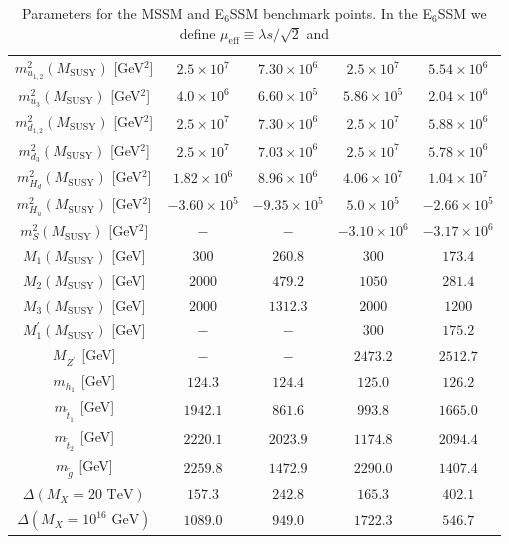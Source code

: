 \documentclass[preprint,amsmath,amssymb,aps,superscriptaddress,prd,showpacs,floatfix,nofootinbib]{revtex4-1}
\begin{document}
\begin{table}[h]
\begin{ruledtabular}
\begin{tabular}{ccccc}
$m_{u_{1,2}}^2(M_{\mathrm{SUSY}})$ [GeV$^2$] & $2.5\times 10^7$ & $7.30\times 10^6$ & $2.5\times 10^7$ & $5.54\times 10^6$ \\
$m_{u_3}^2(M_{\mathrm{SUSY}})$ [GeV$^2$] & $4.0 \times 10^6$ & $6.60\times10^5$& $5.86\times 10^5$ & $2.04\times 10^6$ \\
$m_{d_{1,2}}^2(M_{\mathrm{SUSY}})$ [GeV$^2$] & $2.5\times 10^7$ & $7.30\times 10^6$ & $2.5\times 10^7$ & $5.88\times 10^6$ \\
$m_{d_3}^2(M_{\mathrm{SUSY}})$ [GeV$^2$] & $2.5\times 10^7$ & $7.03\times 10^6$ & $2.5\times 10^7$ & $5.78\times 10^6$ \\
$m_{H_d}^2(M_{\mathrm{SUSY}})$ [GeV$^2$] & $1.82\times 10^6$ & $8.96\times 10^6$ & $4.06\times 10^7$ & $1.04\times 10^7$ \\
$m_{H_u}^2(M_{\mathrm{SUSY}})$ [GeV$^2$] & $-3.60\times 10^5$ & $-9.35\times 10^5$ & $5.0\times 10^5$ & $-2.66\times 10^5$ \\
$m_S^2(M_{\mathrm{SUSY}})$ [GeV$^2$] & $-$ & $-$ & $-3.10\times 10^6$ & $-3.17 \times 10^6$ \\
$M_1(M_{\mathrm{SUSY}})$ [GeV] & $300$ & $260.8$ & $300$ & $173.4$ \\
$M_2(M_{\mathrm{SUSY}})$ [GeV] & $2000$ & $479.2$ & $1050$ & $281.4$ \\
$M_3(M_{\mathrm{SUSY}})$ [GeV] & $2000$ & $1312.3$ & $2000$ & $1200$ \\
$M_1^\prime(M_{\mathrm{SUSY}})$ [GeV] & $-$ & $-$ & $300$ & $175.2$ \\
\hline
$M_{Z^\prime}$ [GeV] & $-$ & $-$ & $2473.2$ & $2512.7$ \\
$m_{h_1}$ [GeV] & $124.3$ & $124.4$ & $125.0$ & $126.2$ \\
$m_{\tilde{t}_1}$ [GeV] & $1942.1$ & $861.6$ & $993.8$ & $1665.0$ \\
$m_{\tilde{t}_2}$ [GeV] & $2220.1$ & $2023.9$ & $1174.8$ & $2094.4$ \\
$m_{\tilde{g}}$ [GeV] & $2259.8$ & $1472.9$ & $2290.0$ & $1407.4$ \\
\hline
$\Delta(M_X=20\textrm{ TeV})$ & $157.3$ & $242.8$ & $165.3$ & $402.1$ \\
$\Delta(M_X=10^{16}\textrm{ GeV})$ & $1089.0$ & $949.0$ & $1722.3$ & $546.7$
\end{tabular}
\end{ruledtabular}
\caption{Parameters for the MSSM and E$_6$SSM benchmark points. In the E$_6$SSM we define $\mu_{\mathrm{eff}}\equiv \lambda s/\sqrt{2}$ and
}
\end{table}
\end{document}
